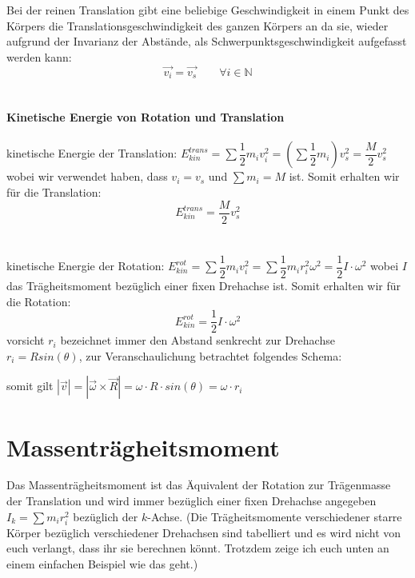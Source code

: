 \documentclass[12pt]{article}
\begin{document}
Bei der reinen Translation gibt eine beliebige Geschwindigkeit in einem Punkt des Körpers die Translationsgeschwindigkeit des ganzen Körpers an da sie, wieder aufgrund der Invarianz der Abstände, als Schwerpunktsgeschwindigkeit aufgefasst werden kann: 
\begin{equation}
\vec{v_i} = \vec{v_s} \qquad \forall i \in \mathbb{N}
\end{equation}
\\
\\
\textbf{Kinetische Energie von Rotation und Translation}
\\
\\ kinetische Energie der Translation: $E_{kin}^{trans} = \sum \dfrac{1}{2}m_i v_i^2 = \left(\sum \dfrac{1}{2} m_i \right) v_s^2 = \dfrac{M}{2} v_s^2$ wobei wir verwendet haben, dass $v_i = v_s$ und $\sum m_i = M$ ist. Somit erhalten wir für die Translation:
\begin{equation}
E_{kin}^{trans} = \dfrac{M}{2} v_s^2
\end{equation}
\\
\\
kinetische Energie der Rotation: $E_{kin}^{rot} = \sum \dfrac{1}{2} m_i v_i^2 = \sum \dfrac{1}{2} m_i r_i^2 \omega^2 = \dfrac{1}{2} I \cdot \omega^2$ wobei $I$ das Trägheitsmoment bezüglich einer fixen Drehachse ist. Somit erhalten wir für die Rotation:
\begin{equation}
E_{kin}^{rot} = \dfrac{1}{2} I \cdot \omega^2
\end{equation}
vorsicht $r_i$ bezeichnet immer den Abstand senkrecht zur Drehachse $r_i = R sin(\theta)$, zur Veranschaulichung betrachtet folgendes Schema:

\begin{figure}[H]
  \label{fig:1teil}
\end{figure}
somit gilt $|\vec{v}| = |\vec{\omega} \times \vec{R}| = \omega \cdot R \cdot sin(\theta) = \omega \cdot r_i$

\section{Massenträgheitsmoment}

Das Massenträgheitsmoment ist das Äquivalent der Rotation zur Trägenmasse der Translation und wird immer bezüglich einer fixen Drehachse angegeben $I_k = \sum m_i r_i^2$ bezüglich der $k$-Achse.
(Die Trägheitsmomente verschiedener starre Körper bezüglich verschiedener Drehachsen sind tabelliert und es wird nicht von euch verlangt, dass ihr sie berechnen könnt. Trotzdem zeige ich euch unten an einem einfachen Beispiel wie das geht.)
\end{document}
